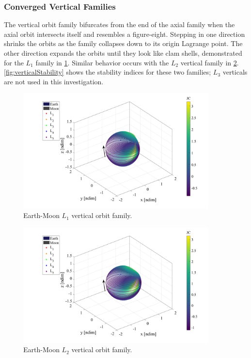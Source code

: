\subsubsection{Converged Vertical Families}
The vertical orbit family bifurcates from the end of the axial family when the axial orbit
intersects itself and resembles a figure-eight. Stepping in one direction shrinks the orbits as the
family collapses down to its origin Lagrange point. The other direction expands the orbits until
they look like clam shells, demonstrated for the $L_{1}$ family in \cref{fig:L1Vertical}. Similar
behavior occurs with the $L_{2}$ vertical family in \cref{fig:L2Vertical}.
\cref{fig:verticalStability} shows the stability indices for these two families; $L_{3}$ verticals
are not used in this investigation.

\begin{figure}[ht]
    \centering
    \includegraphics[width=0.9\textwidth]{figures/L1VerticalFamily.pdf}
    \caption{Earth-Moon $L_{1}$ vertical orbit family.}
    \label{fig:L1Vertical}
\end{figure}

\begin{figure}[ht]
    \centering
    \includegraphics[width=0.9\textwidth]{figures/L2VerticalFamily.pdf}
    \caption{Earth-Moon $L_{2}$ vertical orbit family.}
    \label{fig:L2Vertical}
\end{figure}

